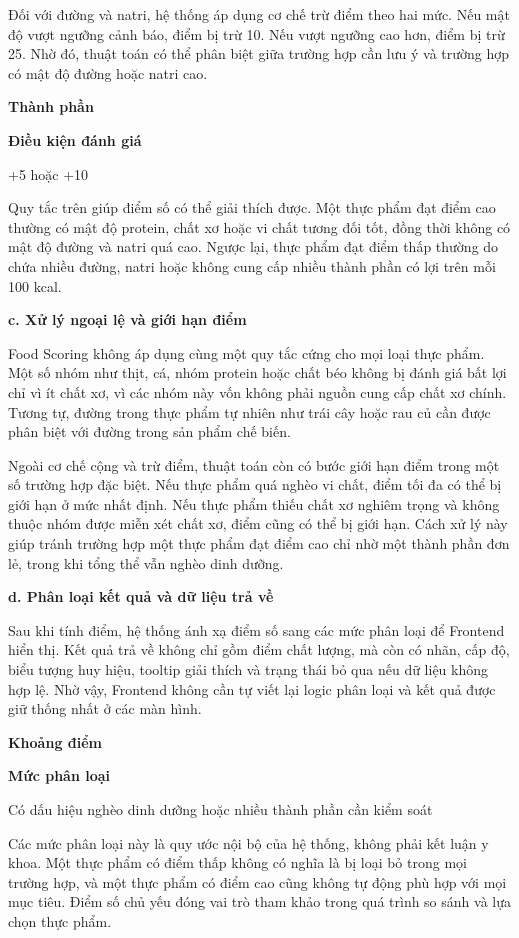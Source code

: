 \documentclass[12pt, a4paper]{report}
\begin{document}
Đối với đường và natri, hệ thống áp dụng cơ chế trừ điểm theo hai mức. Nếu mật độ vượt ngưỡng cảnh báo, điểm bị trừ 10. Nếu vượt ngưỡng cao hơn, điểm bị trừ 25. Nhờ đó, thuật toán có thể phân biệt giữa trường hợp cần lưu ý và trường hợp có mật độ đường hoặc natri cao.

\textbf{Thành phần}

\textbf{Điều kiện đánh giá}

+5 hoặc +10

Quy tắc trên giúp điểm số có thể giải thích được. Một thực phẩm đạt điểm cao thường có mật độ protein, chất xơ hoặc vi chất tương đối tốt, đồng thời không có mật độ đường và natri quá cao. Ngược lại, thực phẩm đạt điểm thấp thường do chứa nhiều đường, natri hoặc không cung cấp nhiều thành phần có lợi trên mỗi 100 kcal.

\textbf{c. Xử lý ngoại lệ và giới hạn điểm}

Food Scoring không áp dụng cùng một quy tắc cứng cho mọi loại thực phẩm. Một số nhóm như thịt, cá, nhóm protein hoặc chất béo không bị đánh giá bất lợi chỉ vì ít chất xơ, vì các nhóm này vốn không phải nguồn cung cấp chất xơ chính. Tương tự, đường trong thực phẩm tự nhiên như trái cây hoặc rau củ cần được phân biệt với đường trong sản phẩm chế biến.

Ngoài cơ chế cộng và trừ điểm, thuật toán còn có bước giới hạn điểm trong một số trường hợp đặc biệt. Nếu thực phẩm quá nghèo vi chất, điểm tối đa có thể bị giới hạn ở mức nhất định. Nếu thực phẩm thiếu chất xơ nghiêm trọng và không thuộc nhóm được miễn xét chất xơ, điểm cũng có thể bị giới hạn. Cách xử lý này giúp tránh trường hợp một thực phẩm đạt điểm cao chỉ nhờ một thành phần đơn lẻ, trong khi tổng thể vẫn nghèo dinh dưỡng.

\textbf{d. Phân loại kết quả và dữ liệu trả về}

Sau khi tính điểm, hệ thống ánh xạ điểm số sang các mức phân loại để Frontend hiển thị. Kết quả trả về không chỉ gồm điểm chất lượng, mà còn có nhãn, cấp độ, biểu tượng huy hiệu, tooltip giải thích và trạng thái bỏ qua nếu dữ liệu không hợp lệ. Nhờ vậy, Frontend không cần tự viết lại logic phân loại và kết quả được giữ thống nhất ở các màn hình.

\textbf{Khoảng điểm}

\textbf{Mức phân loại}

Có dấu hiệu nghèo dinh dưỡng hoặc nhiều thành phần cần kiểm soát

Các mức phân loại này là quy ước nội bộ của hệ thống, không phải kết luận y khoa. Một thực phẩm có điểm thấp không có nghĩa là bị loại bỏ trong mọi trường hợp, và một thực phẩm có điểm cao cũng không tự động phù hợp với mọi mục tiêu. Điểm số chủ yếu đóng vai trò tham khảo trong quá trình so sánh và lựa chọn thực phẩm.
\end{document}

